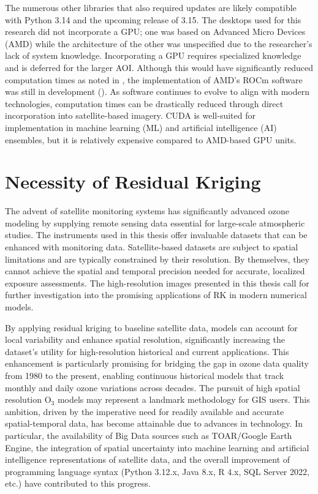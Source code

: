 The numerous other libraries that also required updates are likely compatible with Python 3.14 and the upcoming release of 3.15. The desktops used for this research did not incorporate a GPU; one was based on Advanced Micro Devices (AMD) while the architecture of the other was unspecified due to the researcher's lack of system knowledge. Incorporating a GPU requires specialized knowledge and is deferred for the larger AOI. Although this would have significantly reduced computation times as noted in \textcite{zhang2011}, the implementation of AMD's ROCm software was still in development (\cite{ghimire2022}). As software continues to evolve to align with modern technologies, computation times can be drastically reduced through direct incorporation into satellite-based imagery. CUDA is well-suited for implementation in machine learning (ML) and artificial intelligence (AI) ensembles, but it is relatively expensive compared to AMD-based GPU units.
\section{Necessity of Residual Kriging} \label{sec:enhanceIm} The advent of satellite monitoring systems has significantly advanced ozone modeling by supplying remote sensing data essential for large-scale atmospheric studies. The instruments used in this thesis offer invaluable datasets that can be enhanced with monitoring data. Satellite-based datasets are subject to spatial limitations and are typically constrained by their resolution. By themselves, they cannot achieve the spatial and temporal precision needed for accurate, localized exposure assessments. The high-resolution images presented in this thesis call for further investigation into the promising applications of RK in modern numerical models.

By applying residual kriging to baseline satellite data, models can account for local variability and enhance spatial resolution, significantly increasing the dataset's utility for high-resolution historical and current applications. This enhancement is particularly promising for bridging the gap in ozone data quality from 1980 to the present, enabling continuous historical models that track monthly and daily ozone variations across decades. The pursuit of high spatial resolution O$_3$ models may represent a landmark methodology for GIS users. This ambition, driven by the imperative need for readily available and accurate spatial-temporal data, has become attainable due to advances in technology. In particular, the availability of Big Data sources such as TOAR/Google Earth Engine, the integration of spatial uncertainty into machine learning and artificial intelligence representations of satellite data, and the overall improvement of programming language syntax (Python 3.12.x, Java 8.x, R 4.x, SQL Server 2022, etc.) have contributed to this progress. 
